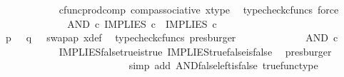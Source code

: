 \begin{isabellebody}
\ \ \ \ \ \ \ \ \ \ \isamarkupfalse%
\ cfunc{\isacharunderscore}{\kern0pt}prod{\isacharunderscore}{\kern0pt}comp\ comp{\isacharunderscore}{\kern0pt}associative{}\ x{\isacharunderscore}{\kern0pt}type\ \isamarkupfalse%
\ {\isacharparenleft}{\kern0pt}typecheck{\isacharunderscore}{\kern0pt}cfuncs{\isacharcomma}{\kern0pt}\ force{\isacharparenright}{\kern0pt}\isanewline
\ \ \ \ \ \ \ \ \isamarkupfalse%
\ \isamarkupfalse%
\ {\isachardoublequoteopen}{\isachardot}{\kern0pt}{\isachardot}{\kern0pt}{\isachardot}{\kern0pt}\ {\isacharequal}{\kern0pt}\ AND\ {\isasymcirc}\isactrlsub c\ {\isasymlangle}IMPLIES\ {\isasymcirc}\isactrlsub c\ {\isasymlangle}{\isasymt}{\isacharcomma}{\kern0pt}{\isasymf}{\isasymrangle}{\isacharcomma}{\kern0pt}\ IMPLIES\ {\isasymcirc}\isactrlsub c\ {\isasymlangle}{\isasymf}{\isacharcomma}{\kern0pt}{\isasymt}{\isasymrangle}{\isasymrangle}{\isachardoublequoteclose}\isanewline
\ \ \ \ \ \ \ \ \ \ \isamarkupfalse%
\ {\isacartoucheopen}p\ {\isacharequal}{\kern0pt}\ {\isasymt}{\isacartoucheclose}\ {\isacartoucheopen}q\ {\isacharequal}{\kern0pt}\ {\isasymf}{\isacartoucheclose}\ swap{\isacharunderscore}{\kern0pt}ap\ x{\isacharunderscore}{\kern0pt}def\ \isamarkupfalse%
\ {\isacharparenleft}{\kern0pt}typecheck{\isacharunderscore}{\kern0pt}cfuncs{\isacharcomma}{\kern0pt}\ presburger{\isacharparenright}{\kern0pt}\isanewline
\ \ \ \ \ \ \ \ \isamarkupfalse%
\ \isamarkupfalse%
\ {\isachardoublequoteopen}{\isachardot}{\kern0pt}{\isachardot}{\kern0pt}{\isachardot}{\kern0pt}\ {\isacharequal}{\kern0pt}\ AND\ {\isasymcirc}\isactrlsub c\ {\isasymlangle}{\isasymf}{\isacharcomma}{\kern0pt}\ {\isasymt}{\isasymrangle}{\isachardoublequoteclose}\isanewline
\ \ \ \ \ \ \ \ \ \ \isamarkupfalse%
\ IMPLIES{\isacharunderscore}{\kern0pt}false{\isacharunderscore}{\kern0pt}true{\isacharunderscore}{\kern0pt}is{\isacharunderscore}{\kern0pt}true\ IMPLIES{\isacharunderscore}{\kern0pt}true{\isacharunderscore}{\kern0pt}false{\isacharunderscore}{\kern0pt}is{\isacharunderscore}{\kern0pt}false\ \isamarkupfalse%
\ presburger\isanewline
\ \ \ \ \ \ \ \ \isamarkupfalse%
\ \isamarkupfalse%
\ {\isachardoublequoteopen}{\isachardot}{\kern0pt}{\isachardot}{\kern0pt}{\isachardot}{\kern0pt}\ {\isacharequal}{\kern0pt}\ {\isasymf}{\isachardoublequoteclose}\isanewline
\ \ \ \ \ \ \ \ \ \ \isamarkupfalse%
\ {\isacharparenleft}{\kern0pt}simp\ add{\isacharcolon}{\kern0pt}\ AND{\isacharunderscore}{\kern0pt}false{\isacharunderscore}{\kern0pt}left{\isacharunderscore}{\kern0pt}is{\isacharunderscore}{\kern0pt}false\ true{\isacharunderscore}{\kern0pt}func{\isacharunderscore}{\kern0pt}type{\isacharparenright}{\kern0pt}\isanewline

\end{isabellebody}
